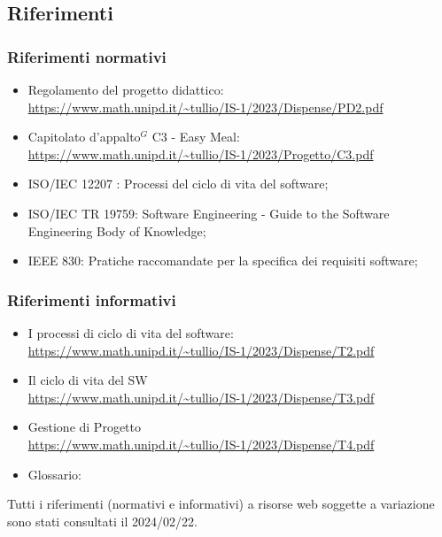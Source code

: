 \subsection{Riferimenti}
\subsubsection{Riferimenti normativi}

        \begin{itemize}
            \item Regolamento del progetto didattico: \\
            \url{https://www.math.unipd.it/~tullio/IS-1/2023/Dispense/PD2.pdf}
            \item Capitolato d’appalto$^{G}$ C3 - Easy Meal: \\
            \url{https://www.math.unipd.it/~tullio/IS-1/2023/Progetto/C3.pdf}
            \item ISO/IEC 12207 : Processi del ciclo di vita del software;
            \item ISO/IEC TR 19759: Software Engineering - Guide to the Software Engineering Body of Knowledge;
            \item IEEE 830: Pratiche raccomandate per la specifica dei requisiti software;
        \end{itemize}
        
        \subsubsection{Riferimenti informativi}

        \begin{itemize}
            \item I processi di ciclo di vita del software: \\
            \url{https://www.math.unipd.it/~tullio/IS-1/2023/Dispense/T2.pdf}
            \item Il ciclo di vita del SW\\
            \url{https://www.math.unipd.it/~tullio/IS-1/2023/Dispense/T3.pdf}
            \item Gestione di Progetto\\
            \url{https://www.math.unipd.it/~tullio/IS-1/2023/Dispense/T4.pdf}
            \item Glossario: \\
            \url{} %
        \end{itemize}

        Tutti i riferimenti (normativi e informativi) a risorse web soggette a variazione sono stati consultati il 2024/02/22.

